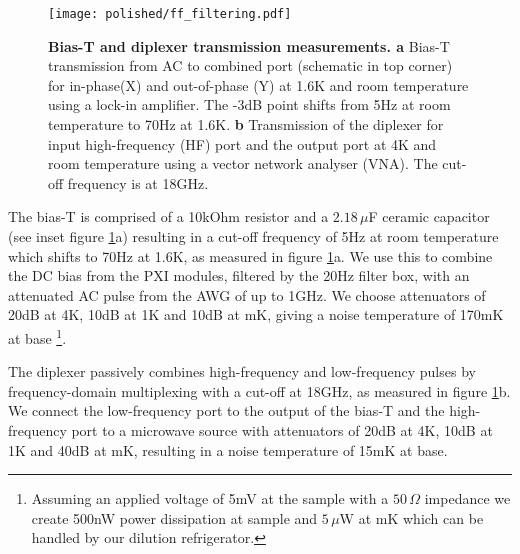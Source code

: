 \begin{figure}
	\centering
	\texttt{[image: polished/ff\_filtering.pdf]}
	\caption[Bias-T and diplexer transmission measurements]{\textbf{Bias-T and diplexer transmission measurements. a} Bias-T transmission from AC to combined port (schematic in top corner) for in-phase(X) and out-of-phase (Y) at 1.6K and room temperature using a lock-in amplifier. The -3dB point shifts from 5Hz at room temperature to 70Hz at 1.6K. \textbf{b} Transmission of the diplexer for input high-frequency (HF) port and the output port at 4K and room temperature using a vector network analyser (VNA). The cut-off frequency is at 18GHz. }
	\label{fig:biast_diplexer}
\end{figure}

The bias-T is comprised of a 10kOhm resistor and a $2.18\,\mu$F ceramic capacitor (see inset figure \ref{fig:biast_diplexer}a) resulting in a cut-off frequency of 5Hz at room temperature which shifts to 70Hz at 1.6K, as measured in figure \ref{fig:biast_diplexer}a. We use this to combine the DC bias from the PXI modules, filtered by the 20Hz filter box, with an attenuated AC pulse from the AWG of up to 1GHz. We choose attenuators of 20dB at 4K, 10dB at 1K and 10dB at mK, giving a noise temperature of 170mK at base
 \footnote{
 Assuming an applied voltage of 5mV at the sample with a $50\,\Omega$ impedance we create 500nW power dissipation at sample and $5\,\mu$W at mK which can be handled by our dilution refrigerator.}.  

The diplexer passively combines high-frequency and low-frequency pulses by frequency-domain multiplexing with a cut-off at 18GHz, as measured in figure \ref{fig:biast_diplexer}b. We connect the low-frequency port to the output of the bias-T and the high-frequency port to a microwave source with attenuators of 20dB at 4K, 10dB at 1K and 40dB at mK, resulting in a noise temperature of 15mK at base. %


